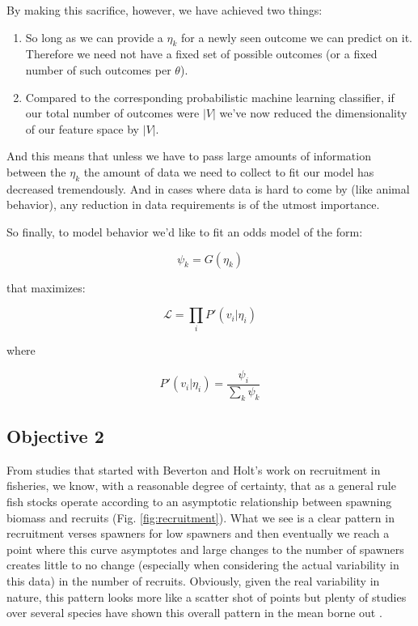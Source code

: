\documentclass[11pt]{article}
\begin{document}
By making this sacrifice, however, we have achieved two things:

\begin{enumerate}
\item So long as we can provide a $\eta_k$ for a newly seen outcome we can predict on it. Therefore we need not have a fixed set of possible outcomes (or a fixed number of such outcomes per $\theta$).
\item Compared to the corresponding probabilistic machine learning classifier, if our total number of outcomes were $|V|$ we've now reduced the dimensionality of our feature space by $|V|$. 
\end{enumerate}

And this means that unless we have to pass large amounts of information between the $\eta_k$ the amount of data we need to collect to fit our model has decreased tremendously. And in cases where data is hard to come by (like animal behavior), any reduction in data requirements is of the utmost importance. 

So finally, to model behavior we'd like to fit an odds model of the form:

$$\psi_k = G(\eta_k)$$

that maximizes:

$$\mathcal{L}=\prod_i P'(v_i | \eta_i)$$

where 

$$P'(v_i|\eta_i) = \frac{\psi_i}{\sum_k \psi_k}$$\newline









\subsection{Objective 2}

From studies that started with Beverton and Holt's work on recruitment in fisheries, we know, with a reasonable degree of certainty, that as a general rule fish stocks operate according to an asymptotic relationship between spawning biomass and recruits \cite{waltersmartell} (Fig. \ref{fig:recruitment}). What we see is a clear pattern in recruitment verses spawners for low spawners and then eventually we reach a point where this curve asymptotes and large changes to the number of spawners creates little to no change (especially when considering the actual variability in this data) in the number of recruits. Obviously, given the real variability in nature, this pattern looks more like a scatter shot of points but plenty of studies over several species have shown this overall pattern in the mean borne out \cite{waltersmartell}. \newline
\end{document}
